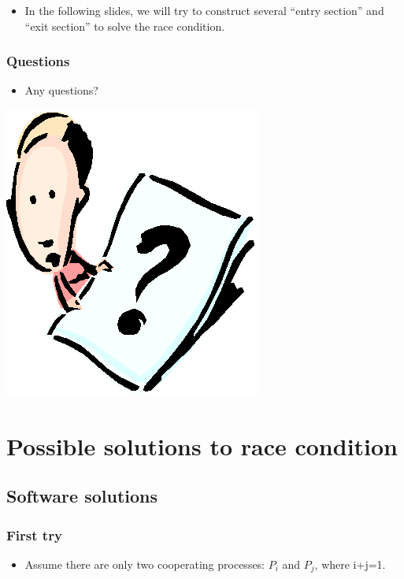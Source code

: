 \documentclass[CJKutf8,xcolor=pdftex,dvipsnames,table]{beamer}
\begin{document}
\begin{CJK*}{UTF8}{song}
\begin{frame}[fragile]
  \pause

  \begin{itemize}
  \item{In the following slides, we will try to construct several ``entry
    section'' and ``exit section'' to solve the race condition.}
  \end{itemize}
\end{frame}

  \begin{frame}
  \frametitle{Questions}
  \begin{itemize}
  \item{Any questions?}
  \end{itemize}
  \begin{center}
    \includegraphics[scale=.5]{question}
  \end{center}
  \end{frame}

\section{Possible solutions to race condition}

\subsection{Software solutions}

  \begin{frame}[fragile]
  \frametitle{First try} \pause
  \begin{itemize}
  \item{Assume there are only two cooperating processes: $P_i$ and $P_j$, where i+j=1.} \pause
  \end{itemize}


\end{frame}
\end{CJK*}
\end{document}
